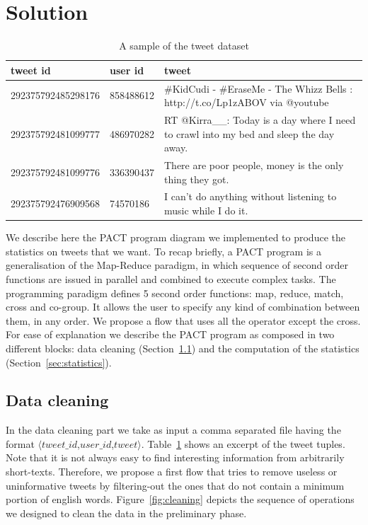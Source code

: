 \section{Solution}
\label{sec:solution}

\begin{table}[!t]
\begin{tabular}{|l|l|l|}
\hline
tweet id & user id & tweet\\
\hline
292375792485298176&858488612& \#KidCudi - \#EraseMe - The Whizz Bells : http://t.co/Lp1zABOV via @youtube\\
292375792481099777&486970282& RT @Kirra\_\_: Today is a day where I need to crawl into my bed and sleep the day away.\\
292375792481099776&336390437& There are poor people, money is the only thing they got.\\
292375792476909568&74570186& I can't do anything without listening to music while I do it.\\
\hline
\end{tabular}
\caption{A sample of the tweet dataset}
\label{tbl:tweets}
\end{table}


We describe here the PACT program diagram we implemented to produce the statistics on tweets that we want. 
To recap briefly, a PACT program is a generalisation of the Map-Reduce paradigm, in which sequence of second order functions are issued in parallel and combined to execute complex tasks. 
The programming paradigm defines 5 second order functions: map, reduce, match, cross and co-group.
It allows the user to specify any kind of combination between them, in any order.
We propose a flow that uses all the operator except the cross. 
For ease of explanation we describe the PACT program as composed in two different blocks: data cleaning (Section~\ref{sec:cleaning}) and the computation of the statistics (Section~\ref{sec:statistics}).

\subsection{Data cleaning}
\label{sec:cleaning}
In the data cleaning part we take as input a comma separated file having the format $\langle tweet\_id$,$user\_id$,$tweet \rangle$. 
Table~\ref{tbl:tweets} shows an excerpt of the tweet tuples. 
Note that it is not always easy to find interesting information from arbitrarily short-texts.
Therefore, we propose a first flow that tries to remove useless or uninformative tweets by filtering-out the ones that do not contain a minimum portion of english words. 
Figure~\ref{fig:cleaning} depicts the sequence of operations we designed to clean the data in the preliminary phase. 

